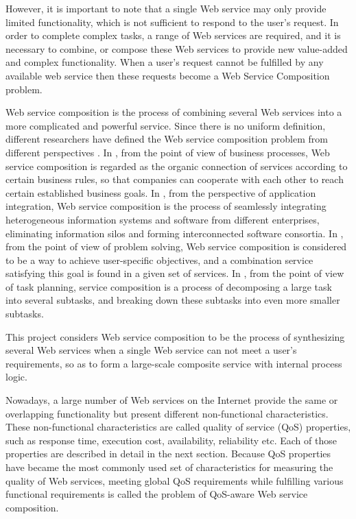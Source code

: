 However, it is important to note that a single Web service may only provide limited functionality, which is not sufficient to respond to the user's request. In order to complete complex tasks, a range of Web services are required, and it is necessary to combine, or compose these Web services to provide new value-added and complex functionality. When a user's request cannot be fulfilled by any available web service then these requests become a Web Service Composition problem.  \

Web service composition is the process of combining several Web services into a more complicated and powerful service. Since there is no uniform definition, different researchers have defined the Web service composition problem from different perspectives \cite{22,21,23,20}. In \cite{20}, from the point of view of business processes, Web service composition is regarded as the organic connection of services according to certain business rules, so that companies can cooperate with each other to reach certain established business goals. In \cite{21}, from the perspective of application integration, Web service composition is the process of seamlessly integrating heterogeneous information systems and software from different enterprises, eliminating information silos and forming interconnected software consortia. In \cite{22}, from the point of view of problem solving, Web service composition is considered to be a way to achieve user-specific objectives, and a combination service satisfying this goal is found in a given set of services. In \cite{23}, from the point of view of task planning, service composition is a process of decomposing a large task into several subtasks, and breaking down these subtasks into even more smaller subtasks.\par

This project considers Web service composition to be the process of synthesizing several Web services when a single Web service can not meet a user's requirements, so as to form a large-scale composite service with internal process logic.\par

Nowadays, a large number of Web services on the Internet provide the same or overlapping functionality but present different non-functional characteristics. These non-functional characteristics are called quality of service (QoS) properties, such as response time, execution cost, availability, reliability etc. Each of those properties are described in detail in the next section. Because QoS properties have became the most commonly used set of characteristics for measuring the quality of Web services, meeting global QoS requirements while fulfilling various functional requirements is called the problem of QoS-aware Web service composition.


